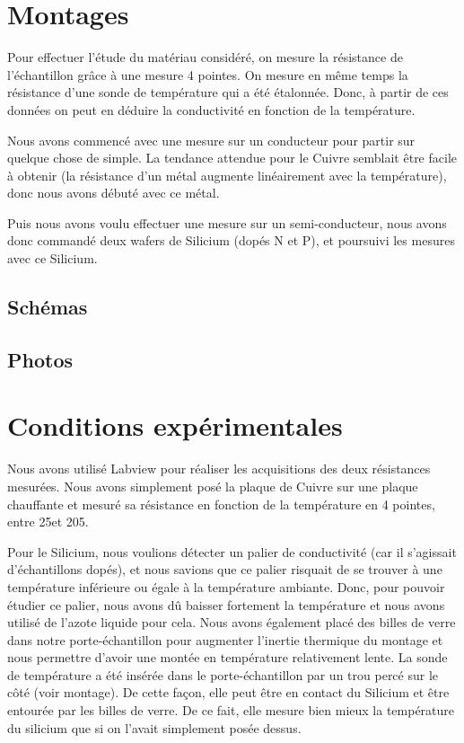 \section*{Montages}
Pour effectuer l'étude du matériau considéré, on mesure la résistance de l'échantillon grâce à une mesure 4 pointes.
On mesure en même temps la résistance d'une sonde de température qui a été étalonnée.
Donc, à partir de ces données on peut en déduire la conductivité en fonction de la température.


Nous avons commencé avec une mesure sur un conducteur pour partir sur quelque chose de simple.
La tendance attendue pour le Cuivre semblait être facile à obtenir (la résistance d'un métal augmente linéairement avec la température), donc nous avons débuté avec ce métal.


Puis nous avons voulu effectuer une mesure sur un semi-conducteur, nous avons donc commandé deux wafers de Silicium (dopés N et P), et poursuivi les mesures avec ce Silicium.


\subsection*{Schémas}

\subsection*{Photos}


\section*{Conditions expérimentales}
Nous avons utilisé Labview pour réaliser les acquisitions des deux résistances mesurées.
Nous avons simplement posé la plaque de Cuivre sur une plaque chauffante et mesuré sa résistance en fonction de la température en 4 pointes, entre 25\celsius et 205\celsius.


Pour le Silicium, nous voulions détecter un palier de conductivité (car il s'agissait d'échantillons dopés), et nous savions que ce palier risquait de se trouver à une température inférieure ou égale à la température ambiante.
Donc, pour pouvoir étudier ce palier, nous avons dû baisser fortement la température et nous avons utilisé de l'azote liquide pour cela.
Nous avons également placé des billes de verre dans notre porte-échantillon pour augmenter l'inertie thermique du montage et nous permettre d'avoir une montée en température relativement lente.
La sonde de température a été insérée dans le porte-échantillon par un trou percé sur le côté (voir montage). De cette façon, elle peut être en contact du Silicium et être entourée par les billes de verre.
De ce fait, elle mesure bien mieux la température du silicium que si on l'avait simplement posée dessus.


